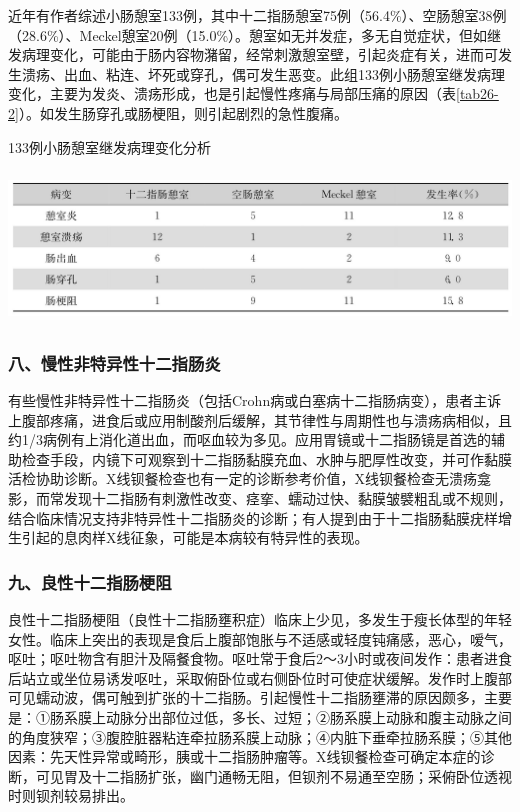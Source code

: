 近年有作者综述小肠憩室133例，其中十二指肠憩室75例（56.4\%）、空肠憩室38例（28.6\%）、Meckel憩室20例（15.0\%）。憩室如无并发症，多无自觉症状，但如继发病理变化，可能由于肠内容物潴留，经常刺激憩室壁，引起炎症有关，进而可发生溃疡、出血、粘连、坏死或穿孔，偶可发生恶变。此组133例小肠憩室继发病理变化，主要为发炎、溃疡形成，也是引起慢性疼痛与局部压痛的原因（表\ref{tab26-2}）。如发生肠穿孔或肠梗阻，则引起剧烈的急性腹痛。

\begin{table}[htbp]
\centering
\caption{133例小肠憩室继发病理变化分析}
\label{tab26-2}
\includegraphics[width=5.91667in,height=1.59375in]{./images/Image00149.jpg}
\end{table}

\subsubsection{八、慢性非特异性十二指肠炎}

有些慢性非特异性十二指肠炎（包括Crohn病或白塞病十二指肠病变），患者主诉上腹部疼痛，进食后或应用制酸剂后缓解，其节律性与周期性也与溃疡病相似，且约1/3病例有上消化道出血，而呕血较为多见。应用胃镜或十二指肠镜是首选的辅助检查手段，内镜下可观察到十二指肠黏膜充血、水肿与肥厚性改变，并可作黏膜活检协助诊断。X线钡餐检查也有一定的诊断参考价值，X线钡餐检查无溃疡龛影，而常发现十二指肠有刺激性改变、痉挛、蠕动过快、黏膜皱襞粗乱或不规则，结合临床情况支持非特异性十二指肠炎的诊断；有人提到由于十二指肠黏膜疣样增生引起的息肉样X线征象，可能是本病较有特异性的表现。

\subsubsection{九、良性十二指肠梗阻}

良性十二指肠梗阻（良性十二指肠壅积症）临床上少见，多发生于瘦长体型的年轻女性。临床上突出的表现是食后上腹部饱胀与不适感或轻度钝痛感，恶心，嗳气，呕吐；呕吐物含有胆汁及隔餐食物。呕吐常于食后2～3小时或夜间发作：患者进食后站立或坐位易诱发呕吐，采取俯卧位或右侧卧位时可使症状缓解。发作时上腹部可见蠕动波，偶可触到扩张的十二指肠。引起慢性十二指肠壅滞的原因颇多，主要是：①肠系膜上动脉分出部位过低，多长、过短；②肠系膜上动脉和腹主动脉之间的角度狭窄；③腹腔脏器粘连牵拉肠系膜上动脉；④内脏下垂牵拉肠系膜；⑤其他因素：先天性异常或畸形，胰或十二指肠肿瘤等。X线钡餐检查可确定本症的诊断，可见胃及十二指肠扩张，幽门通畅无阻，但钡剂不易通至空肠；采俯卧位透视时则钡剂较易排出。

